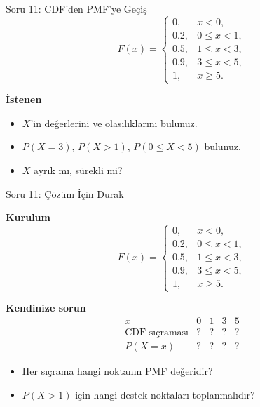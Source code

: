 \documentclass[light]{lutbeamer}
\newcommand{\solutionghost}[1]{{\color{red!45!black}#1}}
\begin{document}
\begin{frame}[t]{Soru 11: CDF'den PMF'ye Geçiş}
\footnotesize
\[
F(x)=
\begin{cases}
0, & x<0,\\
0.2, & 0\le x<1,\\
0.5, & 1\le x<3,\\
0.9, & 3\le x<5,\\
1, & x\ge 5.
\end{cases}
\]

\textbf{İstenen}
\begin{itemize}
  \item[A.] \(X\)'in değerlerini ve olasılıklarını bulunuz.
  \item[B.] \(P(X=3)\), \(P(X>1)\), \(P(0\le X<5)\) bulunuz.
  \item[C.] \(X\) ayrık mı, sürekli mi?
\end{itemize}
\end{frame}

\begin{frame}[t]{Soru 11: Çözüm İçin Durak}
\small
\solutionghost{
\textbf{Kurulum}
\[
F(x)=
\begin{cases}
0, & x<0,\\
0.2, & 0\le x<1,\\
0.5, & 1\le x<3,\\
0.9, & 3\le x<5,\\
1, & x\ge 5.
\end{cases}
\]

\textbf{Kendinize sorun}
\[
\begin{array}{c|cccc}
x & 0 & 1 & 3 & 5\\ \hline
\text{CDF sıçraması} & ? & ? & ? & ? \\
P(X=x) & ? & ? & ? & ?
\end{array}
\]
\begin{itemize}
  \item Her sıçrama hangi noktanın PMF değeridir?
  \item \(P(X>1)\) için hangi destek noktaları toplanmalıdır?
\end{itemize}
}
\end{frame}
\end{document}
